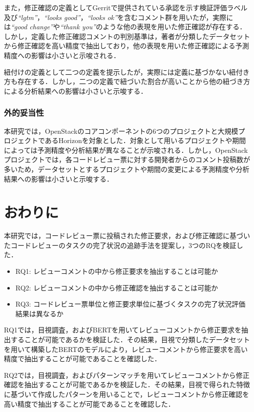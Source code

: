 \documentclass[11pt]{jreport}
\newcommand{\RQOne}{レビューコメントの中から修正要求を抽出することは可能か}
\newcommand{\RQTwo}{レビューコメントの中から修正確認を抽出することは可能か}
\newcommand{\RQThree}{コードレビュー票単位と修正要求単位に基づくタスクの完了状況評価結果は異なるか}
\begin{document}
また，修正確認の定義としてGerritで提供されている承認を示す検証評価ラベル及び\textit{``lgtm''}，\textit{``looks good''}，\textit{``looks ok''}を含むコメント群を用いたが，実際には\textit{``good change''}や\textit{``thank you''}のような他の表現を用いた修正確認が存在する．しかし，定義した修正確認コメントの判別基準は，著者が分類したデータセットから修正確認を高い精度で抽出しており，他の表現を用いた修正確認による予測精度への影響は小さいと示唆される．

紐付けの定義として二つの定義を提示したが，実際には定義に基づかない紐付き方も存在する．しかし，二つの定義で紐づいた割合が高いことから他の紐づき方による分析結果への影響は小さいと示唆する．

\subsection{外的妥当性}
本研究では，OpenStackのコアコンポーネントの6つのプロジェクトと大規模プロジェクトであるHorizonを対象とした．対象として用いるプロジェクトや期間によっては予測精度や分析結果が異なることが示唆される．しかし，OpenStackプロジェクトでは，各コードレビュー票に対する開発者からのコメント投稿数が多いため，データセットとするプロジェクトや期間の変更による予測精度や分析結果への影響は小さいと示唆する．

\chapter{おわりに}\label{chap:conclusion}

本研究では，コードレビュー票に投稿された修正要求，および修正確認に基づいたコードレビューのタスクの完了状況の追跡手法を提案し，3つのRQを検証した．

\begin{itemize}
\item RQ1: \RQOne
\item RQ2: \RQTwo
\item RQ3: \RQThree
\end{itemize}

RQ1では，目視調査，およびBERTを用いてレビューコメントから修正要求を抽出することが可能であるかを検証した．その結果，目視で分類したデータセットを用いて構築したBERTのモデルにより，レビューコメントから修正要求を高い精度で抽出することが可能であることを確認した．

RQ2では，目視調査，およびパターンマッチを用いてレビューコメントから修正確認を抽出することが可能であるかを検証した．その結果，目視で得られた特徴に基づいて作成したパターンを用いることで，レビューコメントから修正確認を高い精度で抽出することが可能であることを確認した．
\end{document}
